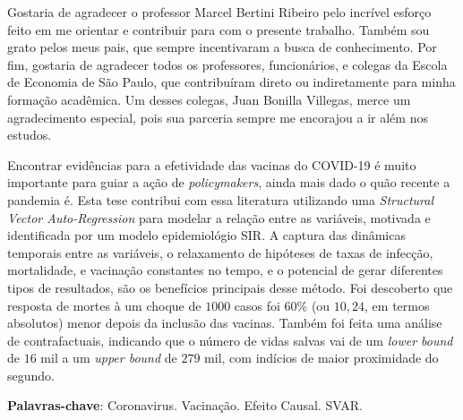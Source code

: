 \documentclass[
    article,
	12pt,				%
	oneside,			%
	a4paper,			%
	english,			%
	brazil,				%
	hyperref = {colorlinks, citecolor=c1d, linkcolor=c2d, urlcolor=c3d, colorlinks}
	]{abntex2}
\newcounter{j}
\begin{document}
\newpage
\begin{resumo}[Agradecimentos]
Gostaria de agradecer o professor Marcel Bertini Ribeiro pelo incrível esforço feito em me orientar e contribuir para com o presente trabalho. Também sou grato pelos meus pais, que sempre incentivaram a busca de conhecimento. Por fim, gostaria de agradecer todos os professores, funcionários, e colegas da Escola de Economia de São Paulo, que contribuíram direto ou indiretamente para minha formação acadêmica. Um desses colegas, Juan Bonilla Villegas, merce um agradecimento especial, pois sua parceria sempre me encorajou a ir além nos estudos.
\end{resumo}




\setlength{\absparsep}{18pt} %
\newpage
\begin{resumo}
   Encontrar evidências para a efetividade das vacinas do COVID-19 é muito importante para guiar a ação de \textit{policymakers}, ainda mais dado o quão recente a pandemia é. Esta tese contribui com essa literatura utilizando uma \textit{Structural Vector Auto-Regression} para modelar a relação entre as variáveis, motivada e identificada por um modelo epidemiológio SIR. A captura das dinâmicas temporais entre as variáveis, o relaxamento de hipóteses de taxas de infecção, mortalidade, e vacinação constantes no tempo, e o potencial de gerar diferentes tipos de resultados, são os benefícios principais desse método. Foi descoberto que resposta de mortes à um choque de $1000$ casos foi $60$\% (ou $10,24$, em termos absolutos) menor depois da inclusão das vacinas. Também foi feita uma análise de contrafactuais, indicando que o número de vidas salvas vai de um \textit{lower bound} de $16$ mil a um \textit{upper bound} de $279$ mil, com indícios de maior proximidade do segundo.
   \vspace{\onelineskip}
 
   \noindent
   \textbf{Palavras-chave}: Coronavirus. Vacinação. Efeito Causal. SVAR.
\end{resumo}
\end{document}
